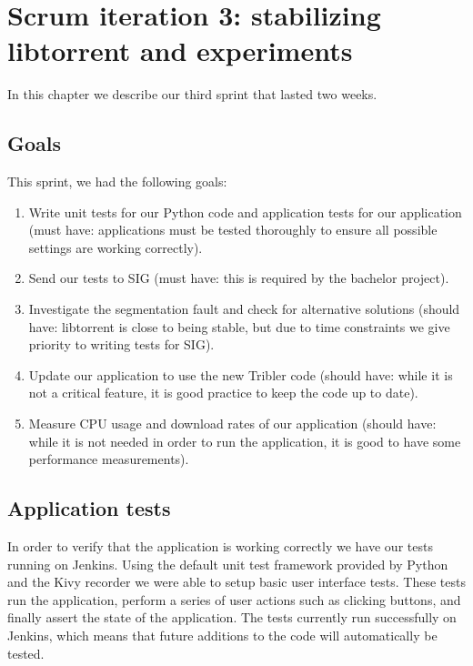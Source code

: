\chapter{Scrum iteration 3: stabilizing libtorrent and experiments}
\label{cpt:iteration3}
	In this chapter we describe our third sprint that lasted two weeks.

	\section{Goals}
		This sprint, we had the following goals:
	
		\begin{enumerate}
			\item Write unit tests for our Python code and application tests for our application (must have: applications must be tested thoroughly to ensure all possible settings are working correctly). 
			\item Send our tests to SIG (must have: this is required by the bachelor project).
			\item Investigate the segmentation fault and check for alternative solutions (should have: libtorrent is close to being stable, but due to time constraints we give priority to writing tests for SIG).
			\item Update our application to use the new Tribler code (should have: while it is not a critical feature, it is good practice to keep the code up to date).
			\item Measure CPU usage and download rates of our application (should have: while it is not needed in order to run the application, it is good to have some performance measurements).
		\end{enumerate}
		
	\section{Application tests}
		In order to verify that the application is working correctly we have our tests running on Jenkins. Using the default unit test framework provided by Python and the Kivy recorder we were able to setup basic user interface tests. These tests run the application, perform a series of user actions such as clicking buttons, and finally assert the state of the application. The tests currently run successfully on Jenkins, which means that future additions to the code will automatically be tested.
		
